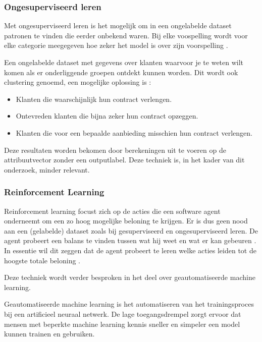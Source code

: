 \subsubsection{Ongesuperviseerd leren}
\label{subsubsec:ongesuperviseerd-leren}

Met ongesuperviseerd leren is het mogelijk om in een ongelabelde dataset patronen te vinden die eerder onbekend waren. Bij elke voospelling wordt voor elke categorie meegegeven hoe zeker het model is over zijn voorspelling \autocite{Hinton1999}.

Een ongelabelde dataset met gegevens over klanten waarvoor je te weten wilt komen als er onderliggende groepen ontdekt kunnen worden. Dit wordt ook clustering genoemd, een mogelijke oplossing is \autocite{Lievens2019}:

\begin{itemize}
    \item Klanten die waarschijnlijk hun contract verlengen.
    \item Ontevreden klanten die bijna zeker hun contract opzeggen.
    \item Klanten die voor een bepaalde aanbieding misschien hun contract verlengen.
\end{itemize}

Deze resultaten worden bekomen door berekeningen uit te voeren op de attribuutvector zonder een outputlabel. Deze techniek is, in het kader van dit onderzoek, minder relevant.

\subsubsection{Reinforcement Learning}
\label{subsubsec:reinforcement-learning}

Reinforcement learning focust zich op de acties die een software agent onderneemt om een zo hoog mogelijke beloning te krijgen. Er is dus geen nood aan een (gelabelde) dataset zoals bij gesuperviseerd en ongesuperviseerd leren. De agent probeert een balans te vinden tussen wat hij weet en wat er kan gebeuren \autocite{Kaelbling1996}. In essentie wil dit zeggen dat de agent probeert te leren welke acties leiden tot de hoogste totale beloning \autocite{Lievens2019}.

Deze techniek wordt verder besproken in het deel over geautomatiseerde machine learning.


Geautomatiseerde machine learning is het automatiseren van het trainingsproces bij een artificieel neuraal netwerk. De lage toegangsdrempel zorgt ervoor dat mensen met beperkte machine learning kennis sneller en simpeler een model kunnen trainen en gebruiken.

